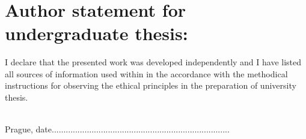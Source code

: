 ~\vfill{}

\section*{Author statement for undergraduate thesis:}
I declare that the presented work was developed independently and I have listed all sources of information used within in the accordance with the methodical instructions for observing the ethical principles in the preparation of university thesis.

\vspace{1.5cm}
~\\

Prague, date.............................\hfill{}...............................................

\hfill{}~~~~~~~~~~~~~~~

\newpage{}
